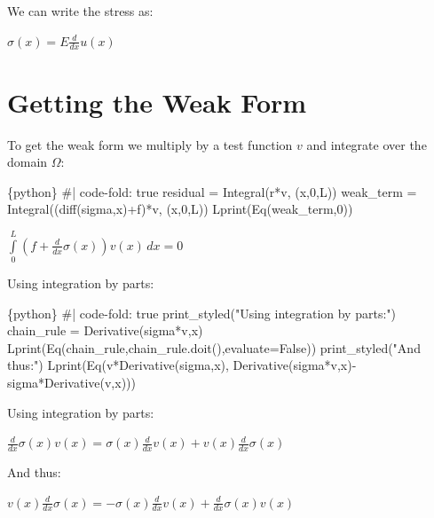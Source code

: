 \documentclass[
  11pt,
  a4paper,
]{scrbook}
\newenvironment{Shaded}{\begin{snugshade}}{\end{snugshade}}
\newcommand{\InformationTok}[1]{\textcolor[rgb]{0.37,0.37,0.37}{#1}}
\begin{document}
We can write the stress as:

$\displaystyle \sigma{\left(x \right)} = E \frac{d}{d x} u{\left(x \right)}$

\section{Getting the Weak Form}\label{getting-the-weak-form}

To get the weak form we multiply by a test function \(v\) and integrate
over the domain \(\Omega\):

\begin{Shaded}
\begin{Highlighting}[]
\InformationTok{\textasciigrave{}\textasciigrave{}\textasciigrave{}\{python\}}
\InformationTok{\#| code{-}fold: true}
\InformationTok{residual = Integral(r*v, (x,0,L))}
\InformationTok{weak\_term = Integral((diff(sigma,x)+f)*v, (x,0,L))}
\InformationTok{Lprint(Eq(weak\_term,0))}
\InformationTok{\textasciigrave{}\textasciigrave{}\textasciigrave{}}
\end{Highlighting}
\end{Shaded}

$\displaystyle \int\limits_{0}^{L} \left(f + \frac{d}{d x} \sigma{\left(x \right)}\right) v{\left(x \right)}\, dx = 0$

Using integration by parts:

\begin{Shaded}
\begin{Highlighting}[]
\InformationTok{\textasciigrave{}\textasciigrave{}\textasciigrave{}\{python\}}
\InformationTok{\#| code{-}fold: true}
\InformationTok{print\_styled("Using integration by parts:")}
\InformationTok{chain\_rule = Derivative(sigma*v,x)}
\InformationTok{Lprint(Eq(chain\_rule,chain\_rule.doit(),evaluate=False))}
\InformationTok{print\_styled("And thus:")}
\InformationTok{Lprint(Eq(v*Derivative(sigma,x), Derivative(sigma*v,x){-}sigma*Derivative(v,x)))}
\InformationTok{\textasciigrave{}\textasciigrave{}\textasciigrave{}}
\end{Highlighting}
\end{Shaded}

Using integration by parts:

$\displaystyle \frac{d}{d x} \sigma{\left(x \right)} v{\left(x \right)} = \sigma{\left(x \right)} \frac{d}{d x} v{\left(x \right)} + v{\left(x \right)} \frac{d}{d x} \sigma{\left(x \right)}$

And thus:

$\displaystyle v{\left(x \right)} \frac{d}{d x} \sigma{\left(x \right)} = - \sigma{\left(x \right)} \frac{d}{d x} v{\left(x \right)} + \frac{d}{d x} \sigma{\left(x \right)} v{\left(x \right)}$
\end{document}
